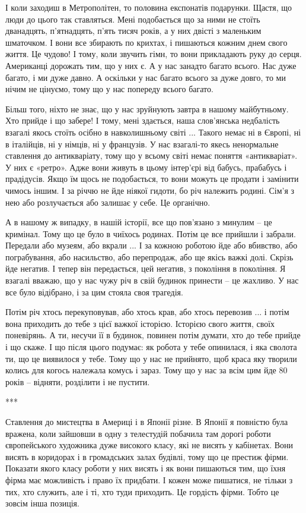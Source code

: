 І коли заходиш в Метрополітен, то половина
експонатів подарунки. Щастя, що люди до цього так ставляться. Мені подобається
що за ними не стоїть дванадцять, п'ятнадцять, п'ять тисяч років, а у них двісті
з маленьким шматочком. І вони все збирають по крихтах, і пишаються кожним днем
свого життя. Це чудово! І тому, коли звучить гімн, то вони прикладають руку до
серця. Американці дорожать тим, що у них є. А у нас занадто багато всього. Нас
дуже багато, і ми дуже давно. А оскільки у нас багато всього за дуже довго, то
ми нічим не цінуємо, тому що у нас попереду всього багато. 

Більш того, ніхто не
знає, що у нас зруйнують завтра в нашому майбутньому. Хто прийде і що забере! І
тому, мені здається, наша слов'янська недбалість взагалі якось стоїть осібно в
навколишньому світі ... Такого немає ні в Європі, ні в італійців, ні у німців,
ні у французів. У нас взагалі-то якесь ненормальне ставлення до антикваріату,
тому що у всьому світі немає поняття «антикваріат». У них є «ретро». Адже вони
живуть в цьому інтер'єрі від бабусь, прабабусь і прадідусів. Якщо їм щось не
подобається, то вони можуть це продати і замінити чимось іншим. І за річчю не
йде ніякої гидоти, бо річ належить родині. Сім'я з нею або розлучається або
залишає у себе. Це органічно. 

А в нашому ж випадку, в нашій історії, все що пов'язано з минулим – це
кримінал. Тому що це було в чиїхось родинах. Потім це все прийшли і забрали.
Передали або музеям, або вкрали ... І за кожною роботою йде або вбивство, або
пограбування, або насильство, або перепродаж, або ще якісь важкі долі. Скрізь
йде негатив. І тепер він передається, цей негатив, з покоління в покоління. Я
взагалі вважаю, що у нас чужу річ в свій будинок принести – це жахливо. У нас
все було відібрано, і за цим стояла своя трагедія.

Потім річ хтось перекуповував, або хтось крав, або хтось перевозив ... і потім
вона приходить до тебе з цієї важкої історією. Історією свого життя, своїх
поневірянь. А ти, несучи її в будинок, повинен потім думати, хто до тебе прийде
і що скаже. І що після цього подумає: як робота у тебе опинилася, і яка сволота
ти, що це виявилося у тебе. Тому що у нас не прийнято, щоб краса яку творили
колись для когось належала комусь і зараз. Тому що у нас за всім цим йде 80
років – відняти, розділити і не пустити.

***

Ставлення до мистецтва в Америці і в Японії різне. В Японії я повністю була
вражена, коли зайшовши в одну з телестудій побачила там дорогі роботи
європейського художника дуже високого класу, які не висять у кабінетах. Вони
висять в коридорах і в громадських залах будівлі, тому що це престиж фірми.
Показати якого класу роботи у них висять і як вони пишаються тим, що їхня фірма
має можливість і право їх придбати. І кожен може пишатися, не тільки з тих, хто
служить, але і ті, хто туди приходить. Це гордість фірми. Тобто це зовсім інша
позиція.

